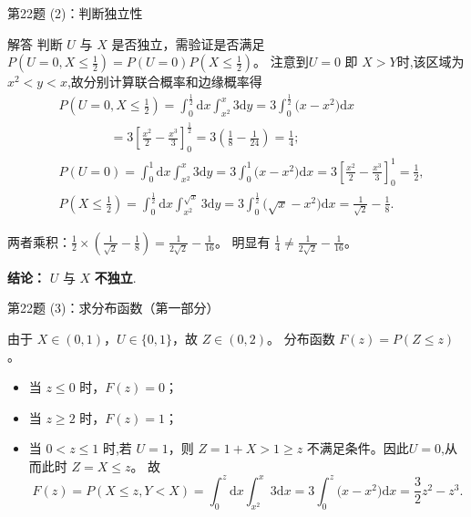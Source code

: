 \documentclass[aspectratio=169]{beamer}
\begin{document}
\begin{frame}{第22题 (2)：判断独立性}
\begin{block}{解答}
判断 \(U\) 与 \(X\) 是否独立，需验证是否满足 \(P(U=0, X \le \frac{1}{2}) = P(U=0)P(X \le \frac{1}{2})\)。
注意到\(U=0\) 即 \(X>Y\)时,该区域为 \(x^2 < y < x\),故分别计算联合概率和边缘概率得
\begin{align*}
&P(U=0,X\le \frac{1}{2})=\int_0^{\frac{1}{2}}{\mathrm{d}x\int_{x^2}^x{3\mathrm{d}y}}=3\int_0^{\frac{1}{2}}{(x}-x^2)\mathrm{d}x
\\
&\quad \quad \quad \quad =3\left[ \frac{x^2}{2}-\frac{x^3}{3} \right] _{0}^{\frac{1}{2}}=3\left( \frac{1}{8}-\frac{1}{24} \right) =\frac{1}{4};
\\
&P(U=0)=\int_0^1{\mathrm{d}x\int_{x^2}^x{3\mathrm{d}y}}=3\int_0^1{(x}-x^2)\mathrm{d}x=3\left[ \frac{x^2}{2}-\frac{x^3}{3} \right] _{0}^{1}=\frac{1}{2},
\\
&P(X\le \frac{1}{2})=\int_0^{\frac{1}{2}}{\mathrm{d}x\int_{x^2}^{\sqrt{x}}{3\mathrm{d}y}}=3\int_0^{\frac{1}{2}}{(\sqrt{x}}-x^2)\mathrm{d}x=\frac{1}{\sqrt{2}}-\frac{1}{8}.
\end{align*}

两者乘积：\(\frac{1}{2} \times (\frac{1}{\sqrt{2}} - \frac{1}{8}) = \frac{1}{2\sqrt{2}} - \frac{1}{16}\)。
明显有 \(\frac{1}{4} \neq \frac{1}{2\sqrt{2}} - \frac{1}{16}\)。

\textbf{结论：} \(U\) 与 \(X\) \textbf{不独立}.
\end{block}
\end{frame}

\begin{frame}{第22题 (3)：求分布函数（第一部分）}
\begin{block}{}
由于 \(X \in (0,1)\)，\(U \in \{0,1\}\)，故 \(Z \in (0,2)\)。
分布函数 \(F(z) = P(Z \le z)\)。
\begin{itemize}
\item 当 \(z \le 0\) 时，\(F(z) = 0\)；
\item 当 \(z \ge 2\) 时，\(F(z) = 1\)；
\item 当 \(0 < z \leqslant 1\) 时,若 \(U=1\)，则 \(Z=1+X > 1 \ge z\) 不满足条件。因此\(U=0\),从而此时 \(Z=X \le z\)。
故
\[
F(z)=P\left( X\le z,Y<X \right) =\int_0^z{\mathrm{d}x}\int_{x^2}^x{3\mathrm{d}x}=3\int_0^z{(x}-x^2)\mathrm{d}x=\frac{3}{2}z^2-z^3.
\]
\end{itemize}
\end{block}
\end{frame}
\end{document}
